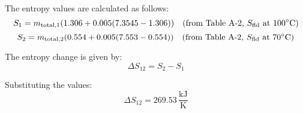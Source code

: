 The entropy values are calculated as follows:  
\[
S_1 = m_{\text{total},1} (1.306 + 0.005 (7.3545 - 1.306)) \quad \text{(from Table A-2, \( S_{\text{fld}} \) at \( 100^\circ\text{C} \))}
\]  
\[
S_2 = m_{\text{total},2} (0.554 + 0.005 (7.553 - 0.554)) \quad \text{(from Table A-2, \( S_{\text{fld}} \) at \( 70^\circ\text{C} \))}
\]  

The entropy change is given by:  
\[
\Delta S_{12} = S_2 - S_1
\]  

Substituting the values:  
\[
\Delta S_{12} = 269.53 \, \frac{\text{kJ}}{\text{K}}
\]